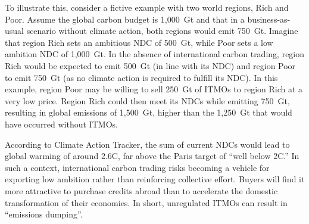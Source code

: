 \documentclass[12pt,english]{article}
\begin{document}
To illustrate this, consider a fictive example with two world regions, Rich and Poor. %
Assume the global carbon budget is 1,000~Gt and that in a business-as-usual scenario without climate action, both regions would emit 750~Gt. Imagine that region Rich sets an ambitious NDC of 500~Gt, while Poor sets a low ambition NDC of 1,000~Gt. In the absence of international carbon trading, region Rich would be expected to emit 500~Gt (in line with its NDC) and region Poor to emit 750~Gt (as no climate action is required to fulfill its NDC). In this example, region Poor may be willing to sell 250~Gt of ITMOs to region Rich at a very low price. Region Rich could then meet its NDCs while emitting 750~Gt, resulting in global emissions of 1,500~Gt, higher than the 1,250~Gt that would have occurred without ITMOs.

According to Climate Action Tracker, the sum of current NDCs would lead to global warming of around 2.6\textdegree{}C, far above the Paris target of ``well below 2\textdegree{}C.'' In such a context, international carbon trading risks becoming a vehicle for exporting low ambition rather than reinforcing collective effort. Buyers will find it more attractive to purchase credits abroad than to accelerate the domestic transformation of their economies. In short, unregulated ITMOs can result in ``emissions dumping''.
\end{document}
